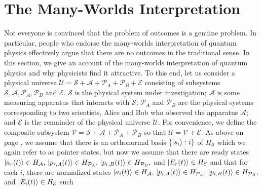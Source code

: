  
    \section{The Many-Worlds Interpretation}\label{manyworldsinterpretation1}
    Not everyone is convinced that the problem of outcomes is a genuine problem. In particular, people who endorse the many-worlds interpretation of quantum physics effectively argue that there are no outcomes in the traditional sense. In this section, we give an account of the many-worlds interpretation of quantum physics and why physicists find it attractive. To this end, let us consider a physical universe $\mathcal{U}=\mathcal{S}+\mathcal{A}+\mathcal{P}_A+\mathcal{P}_B+\mathcal{E}$ consisting of subsystems $\mathcal{S}, \mathcal{A}, \mathcal{P}_A,\mathcal{P}_B$  %
%
    and $\mathcal{E}$. $\mathcal{S}$ is the physical system under investigation; $\mathcal{A}$ is some measuring apparatus that interacts with $\mathcal{S}$; $\mathcal{P}_A$ and $\mathcal{P}_B$ are the physical systems corresponding to two scientists, Alice and Bob who observed the apparatus $\mathcal{A}$; and $\mathcal{E}$ is the remainder of the physical universe $\mathcal{U}$.  For convenience, we define the composite subsystem $\mathcal{V}=\mathcal{S}+\mathcal{A}+\mathcal{P}_A+\mathcal{P}_B$ %
%
    so that $\mathcal{U}=\mathcal{V}+\mathcal{E}$. As above on page \pageref{pointer}, we  assume that there is an orthonormal basis $\{\ket{s_i}:i\}$ of $H_\mathcal{S}$ which we again refer to as pointer states, but now we assume that there are ready states $\ket{a_r(t)}\in H_\mathcal{A},\,\ket{p_{r, A}(t)}\in H_{\mathcal{P}_A},\,\ket{p_{r, B}(t)}\in H_{\mathcal{P}_B},$ and  %
%
    $\ket{E_r(t)}\in H_\mathcal{E}$ and %
    that for each $i$, there are normalized states $\ket{a_i(t)}\in H_\mathcal{A},\,\ket{p_{i, A}(t)}\in H_{\mathcal{P}_A},\,\ket{p_{i, B}(t)}\in H_{\mathcal{P}_B},$ and $\ket{E_i(t)}\in H_\mathcal{E}$ such 
